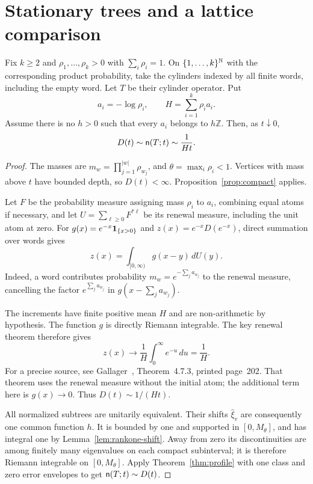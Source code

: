 \section{Stationary trees and a lattice comparison}\label{sec:stationary}
\begin{proposition}\label{prop:stationary}
Fix $k\ge2$ and $\rho_1,\ldots,\rho_k>0$ with $\sum_i\rho_i=1$.
On $\{1,\ldots,k\}^{\mathbb N}$ with the corresponding product probability,
take the cylinders indexed by all finite words, including the empty word.
Let $T$ be their cylinder operator. Put
\[
 a_i=-\log\rho_i,\qquad H=\sum_{i=1}^k\rho_i a_i.
\]
Assume there is no $h>0$ such that every $a_i$ belongs to $h\mathbb Z$.
Then, as $t\downarrow0$,
\[
 D(t)\sim\mathsf n(T;t)\sim\frac1{Ht}.
\]
\end{proposition}
\begin{proof}
The masses are $m_w=\prod_{j=1}^{|w|}\rho_{w_j}$, and
$\theta=\max_i\rho_i<1$. Vertices with mass above $t$ have bounded depth,
so $D(t)<\infty$. Proposition~\ref{prop:compact} applies.

Let $F$ be the probability measure assigning mass $\rho_i$ to $a_i$,
combining equal atoms if necessary, and let
$U=\sum_{\ell\ge0}F^{*\ell}$ be its renewal measure, including the
unit atom at zero. For $g(x)=e^{-x}\mathbf 1_{\{x>0\}}$ and
$z(x)=e^{-x}D(e^{-x})$, direct summation over words gives
\[
 z(x)=\int_{[0,\infty)}g(x-y)\,dU(y).
\]
Indeed, a word contributes probability $m_w=e^{-\sum_j a_{w_j}}$
to the renewal measure, cancelling the factor $e^{\sum_j a_{w_j}}$
in $g(x-\sum_j a_{w_j})$.

The increments have finite positive mean $H$ and are non-arithmetic
by hypothesis. The function $g$ is directly Riemann integrable.
The key renewal theorem therefore gives
\[
 z(x)\longrightarrow\frac1H\int_0^\infty e^{-u}\,du=\frac1H.
\]
For a precise source, see Gallager~\cite{Gallager}, Theorem~4.7.3,
printed page~202. That theorem uses the renewal measure without the
initial atom; the additional term here is $g(x)\to0$.
Thus $D(t)\sim1/(Ht)$.

All normalized subtrees are unitarily equivalent. Their shifts
$\widehat\xi_v$ are consequently one common function $h$.
It is bounded by one and supported in $[0,M_\theta]$, and has integral
one by Lemma~\ref{lem:rankone-shift}. Away from zero its discontinuities
are among finitely many eigenvalues on each compact subinterval; it is
therefore Riemann integrable on $[0,M_\theta]$. Apply
Theorem~\ref{thm:profile} with one class and zero error envelopes to get
$\mathsf n(T;t)\sim D(t)$.
\end{proof}


